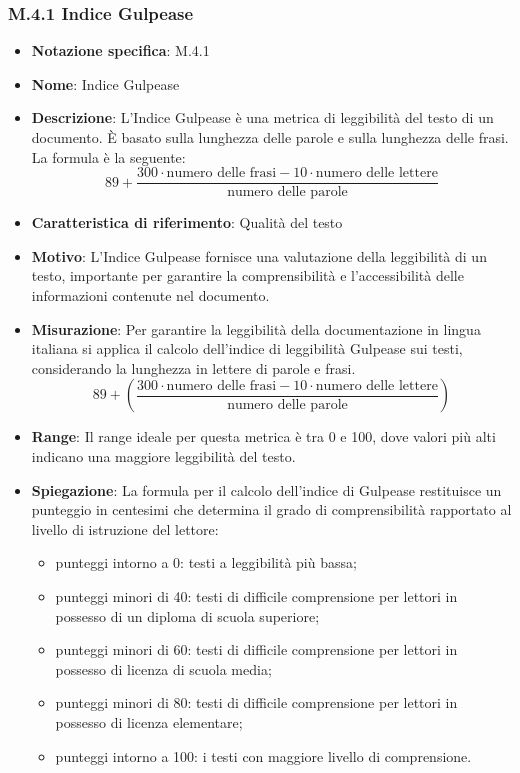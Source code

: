 \subsubsection{M.4.1 Indice Gulpease}
\begin{itemize}
    \item \textbf{Notazione specifica}: M.4.1
    \item \textbf{Nome}: Indice Gulpease
    \item \textbf{Descrizione}: L'Indice Gulpease è una metrica di leggibilità del testo di un documento. È basato sulla lunghezza delle parole e sulla lunghezza delle frasi. La formula è la seguente: \[ 89+\frac{300 \cdot \text{{numero delle frasi}} - 10 \cdot \text{{numero delle lettere}}}{\text{{numero delle parole}}} \]
    \item \textbf{Caratteristica di riferimento}: Qualità del testo
    \item \textbf{Motivo}: L'Indice Gulpease fornisce una valutazione della leggibilità di un testo, importante per garantire la comprensibilità e l'accessibilità delle informazioni contenute nel documento.
    \item \textbf{Misurazione}: Per garantire la leggibilità della documentazione in lingua italiana si applica il calcolo dell’indice di leggibilità Gulpease sui testi, considerando la lunghezza in lettere di parole e frasi.
    \[ 89 + \left( \frac{{300 \cdot \text{{numero delle frasi}} - 10 \cdot \text{{numero delle lettere}}}}{{\text{{numero delle parole}}}} \right) \]
    \item \textbf{Range}: Il range ideale per questa metrica è tra 0 e 100, dove valori più alti indicano una maggiore leggibilità del testo.
    \item \textbf{Spiegazione}: La formula per il calcolo dell’indice di Gulpease restituisce un punteggio in centesimi che determina il grado di comprensibilità rapportato al livello di istruzione del lettore:
    \begin{itemize}
        \item punteggi intorno a 0: testi a leggibilità più bassa;
        \item punteggi minori di 40: testi di difficile comprensione per lettori in possesso di un diploma di scuola superiore;
        \item punteggi minori di 60: testi di difficile comprensione per lettori in possesso di licenza di scuola media;
        \item punteggi minori di 80: testi di difficile comprensione per lettori in possesso di licenza elementare;
        \item punteggi intorno a 100: i testi con maggiore livello di comprensione.
    \end{itemize}
\end{itemize}
